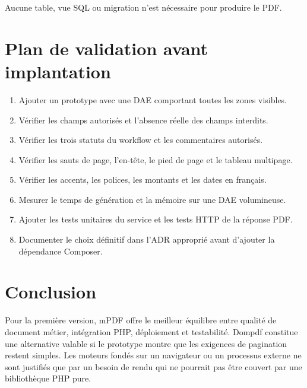 \documentclass[11pt,a4paper]{article}
\begin{document}
Aucune table, vue SQL ou migration n'est nécessaire pour produire le PDF.

\section{Plan de validation avant implantation}

\begin{enumerate}
  \item Ajouter un prototype avec une DAE comportant toutes les zones visibles.
  \item Vérifier les champs autorisés et l'absence réelle des champs interdits.
  \item Vérifier les trois statuts du workflow et les commentaires autorisés.
  \item Vérifier les sauts de page, l'en-tête, le pied de page et le tableau multipage.
  \item Vérifier les accents, les polices, les montants et les dates en français.
  \item Mesurer le temps de génération et la mémoire sur une DAE volumineuse.
  \item Ajouter les tests unitaires du service et les tests HTTP de la réponse PDF.
  \item Documenter le choix définitif dans l'ADR approprié avant d'ajouter la dépendance Composer.
\end{enumerate}

\section{Conclusion}

Pour la première version, mPDF offre le meilleur équilibre entre qualité de
document métier, intégration PHP, déploiement et testabilité. Dompdf constitue
une alternative valable si le prototype montre que les exigences de pagination
restent simples. Les moteurs fondés sur un navigateur ou un processus externe
ne sont justifiés que par un besoin de rendu qui ne pourrait pas être couvert
par une bibliothèque PHP pure.
\end{document}

